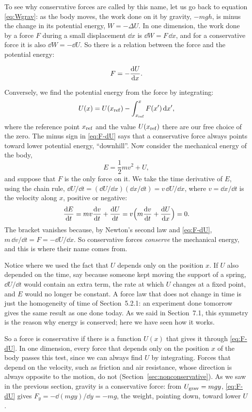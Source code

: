 \documentclass[11pt,a4paper]{article}
\begin{document}
To see why conservative forces are called by this name, let us go back to equation
\eqref{eq:Wgrav}: as the body moves, the work done on it by gravity, $-mgh$, is minus the change in
its potential energy, $W = -\Delta U$. In one dimension, the work done by a force $F$ during a small displacement $\dd x$ is
$\dd W = F\,\dd x$, and for a conservative force it is also $\dd W = -\dd U$. So there is a relation
between the force and the potential energy:
\begin{keyresult}
\begin{equation}\label{eq:F-dU}
  F = -\frac{\mathrm{d} U}{\mathrm{d} x} .
\end{equation}
\end{keyresult}
Conversely, we find the potential energy from the force by integrating:
\[
  U(x) = U(x_{\mathrm{ref}}) - \int_{x_{\mathrm{ref}}}^{x} F(x')\,\mathrm{d} x' ,
\]
where the reference point $x_{\mathrm{ref}}$ and the value $U(x_{\mathrm{ref}})$ there are our free choice of
the zero. The minus sign in \eqref{eq:F-dU} says that a conservative force always points toward
lower potential energy, ``downhill''. Now consider the mechanical energy of the body,
\begin{equation}\label{eq:E}
  E = \frac12 mv^2 + U ,
\end{equation}
and suppose that $F$ is the only force on it. We take the time derivative of $E$, using the chain
rule, $\dd U/\dd t = (\dd U/\dd x)(\dd x/\dd t) = v\,\dd U/\dd x$, where $v = \dd x/\dd t$ is the
velocity along $x$, positive or negative:
\begin{equation}\label{eq:dEdt}
  \frac{\mathrm{d} E}{\mathrm{d} t} = mv\frac{\mathrm{d} v}{\mathrm{d} t} + \frac{\mathrm{d} U}{\mathrm{d} t} = v\Bigl(m\frac{\mathrm{d} v}{\mathrm{d} t} + \frac{\mathrm{d} U}{\mathrm{d} x}\Bigr) = 0 .
\end{equation}
The bracket vanishes because, by Newton's second law and \eqref{eq:F-dU},
$m\,\dd v/\dd t = F = -\dd U/\dd x$. So conservative forces \emph{conserve} the mechanical energy,
and this is where their name comes from.

Notice where we used the fact that $U$ depends only on the position $x$. If $U$ also depended on the
time, say because someone kept moving the support of a spring, $\dd U/\dd t$ would contain an extra
term, the rate at which $U$ changes at a fixed point, and $E$ would no longer be constant. A force
law that does not change in time is just the homogeneity of time of Section~5.2.1: an experiment
done tomorrow gives the same result as one done today. As we said in Section~7.1, this symmetry is
the reason why energy is conserved; here we have seen how it works.

So a force is conservative if there is a function $U(x)$ that gives it through \eqref{eq:F-dU}. In
one dimension, every force that depends only on the position $x$ of the body passes this test, since
we can always find $U$ by integrating. Forces that depend on the velocity, such as friction and air
resistance, whose direction is always opposite to the motion, do not (Section~\ref{sec:nonconservative}).
As we saw in the previous section, gravity is a conservative force: from $U_{\mathrm{grav}} = mgy$,
\eqref{eq:F-dU} gives $F_y = -\dd(mgy)/\dd y = -mg$, the weight, pointing down, toward lower $U$.
\end{document}
